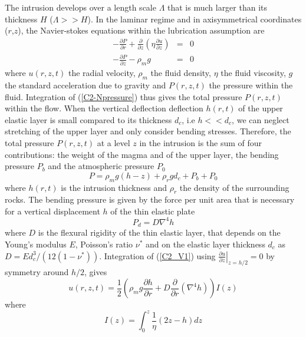 The  intrusion develops  over a  length scale  $\Lambda$ that  is much
larger than its thickness $H$ ($\Lambda >> H$).  In the laminar regime
and  in   axisymmetrical  coordinates  ($r$,$z$),   the  Navier-stokes
equations within the lubrication assumption are
\begin{eqnarray}
  -\frac{\partial P}{\partial r}  +  \frac{\partial}{\partial z}\left(\eta \frac{\partial u}{\partial z}\right) &=&0\label{C2_V1} \\
  -\frac{\partial P}{\partial z}  - \rho_{m}g&  =&0\label{C2-Npressure}
\end{eqnarray}
where  $u(r,z,t)$ the  radial  velocity, $\rho_m$  the fluid  density,
$\eta$  the fluid  viscosity,  $g$ the  standard  acceleration due  to
gravity and $P(r,z,t)$ the pressure  within the fluid.  Integration of
(\ref{C2-Npressure}) thus  gives the total pressure  $P(r,z,t)$ within
the flow.   When the  vertical deflection  deflection $h(r,t)$  of the
upper  elastic layer  is small  compared to  its thickness  $d_c$, i.e
$h<<d_c$,  we can  neglect  stretching  of the  upper  layer and  only
consider bending stresses. Therefore, the total pressure $P(r,z,t)$ at
a level  $z$ in the  intrusion is the  sum of four  contributions: the
weight of the magma and of the upper layer, the bending pressure $P_b$
and the atmospheric pressure $P_0$
\begin{equation}
  P = \rho_m g (h-z)+\rho_rgd_c+P_b+P_0
\end{equation}
where $h(r,t)$ is the intrusion  thickness and $\rho_r$ the density of
the surrounding rocks. The bending pressure  is given by the force per
unit area  that is necessary  for a  vertical displacement $h$  of the
thin elastic plate \citep{Turcotte:1982ca}
\begin{equation}
  P_d = D\nabla^4h
\end{equation}
where $D$  is the flexural  rigidity of  the thin elastic  layer, that
depends on the Young's modulus $E$, Poisson's ratio $\nu^*$ and on the
elastic           layer          thickness           $d_c$          as
$D =  Ed_c^3/\left(12(1-\nu^*)\right)$.  Integration  of (\ref{C2_V1})
using   $\left.\frac{\partial   u}{\partial  z}\right|_{z=h/2}=0$   by
symmetry around $h/2$, gives
\begin{equation}
  u(r,z,t)=\frac{1}{2}\left(\rho_m g \frac{\partial h}{\partial      r}+D\frac{\partial}{\partial      r}\left(\nabla^4h\right)\right)I(z)
  \label{C2-V2}
\end{equation}
where
\begin{equation}
  I(z) = \int_0^z  \frac{1}{\eta}\left( 2 z -h\right)dz
\end{equation}
